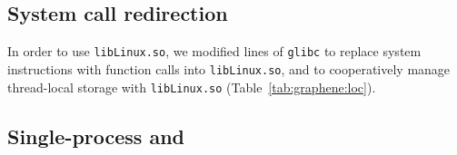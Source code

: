 \subsection{System call redirection}




\begin{comment}
Most {\tt libLinux.so} code reimplements
Linux kernel functionality.  We found it expedient to 
read the Linux source in order to understand its behavior and then reimplement 
that behavior on the \pal{} ABI in most cases.
In some cases, such as the file caching code,
we refactored code directly from the Linux kernel.
\end{comment}

In order to use {\tt libLinux.so}, we modified \libclines{} lines of {\tt glibc} to replace 
system instructions with function calls into {\tt lib\-Linux.so},
and to cooperatively manage thread-local storage with {\tt libLinux.so} (Table~\ref{tab:graphene:loc}).


\begin{comment}
\vspace{5pt}
\noindent{\bf ABI Extensions.~}
\graphene{} extends the Drawbridge ABI with 9 additional \pal{} calls.
As discussed above, one creates a new sandbox, and 
5 additional calls were added for IPC.
We also add 3 calls to manage x86 segmentation registers
and exceptions (Bascule~\cite{baumann13bascule} adds
similar extensions).
\end{comment}








\subsection{Single-process  and }




